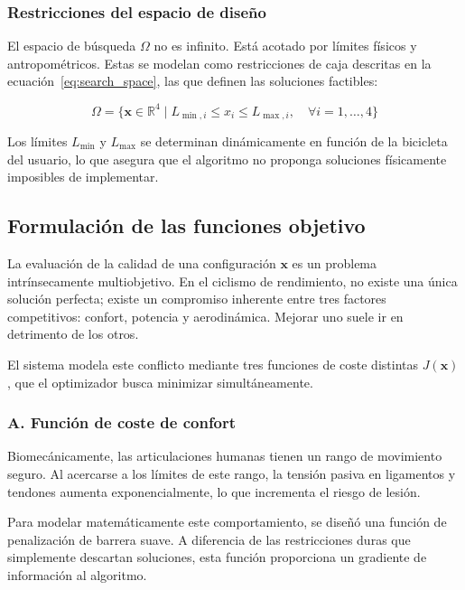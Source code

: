 \subsubsection{Restricciones del espacio de diseño}

El espacio de búsqueda $\Omega$ no es infinito. Está acotado por límites
físicos y antropométricos. Estas se modelan como restricciones de caja descritas en la ecuación~\ref{eq:search_space}, las que
definen las soluciones factibles:

\begin{equation}
  \label{eq:search_space}
  \Omega = \{ \mathbf{x} \in \mathbb{R}^{4} \mid L_{\min,i} \leq x_i \leq L_{\max,i}, \quad \forall i=1,\dots,4 \}
\end{equation}

Los límites $L_{\min}$ y $L_{\max}$ se determinan dinámicamente en función de
la bicicleta del usuario, lo que asegura que el algoritmo no proponga
soluciones físicamente imposibles de implementar.

\subsection{Formulación de las funciones objetivo}
\label{subsec:funciones_objetivo}

La evaluación de la calidad de una configuración $\mathbf{x}$ es un problema
intrínsecamente multiobjetivo. En el ciclismo de rendimiento, no existe una
única solución perfecta; existe un compromiso inherente entre tres factores
competitivos: confort, potencia y aerodinámica. Mejorar uno suele ir en
detrimento de los otros.

El sistema modela este conflicto mediante tres funciones de coste distintas
$J(\mathbf{x})$, que el optimizador busca minimizar simultáneamente.

\subsubsection{A. Función de coste de confort}

Biomecánicamente, las articulaciones humanas tienen un rango de movimiento
seguro. Al acercarse a los límites de este rango, la tensión pasiva en
ligamentos y tendones aumenta exponencialmente, lo que incrementa el riesgo de
lesión.

Para modelar matemáticamente este comportamiento, se diseñó una función de
penalización de barrera suave. A diferencia de las restricciones duras que
simplemente descartan soluciones, esta función proporciona un gradiente de
información al algoritmo.

